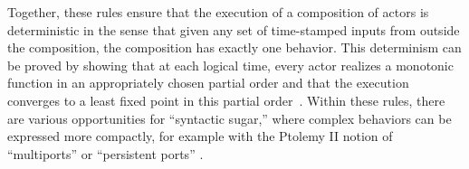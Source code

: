 \documentclass[sigconf]{acmart}
\newcommand{\martin}[1]{\mynote{Martin}{#1}{blue}}%
\newcommand{\marten}[1]{\mynote{Marten}{#1}{cyan}}%
\newcommand{\edward}[1]{\mynote{Edward}{#1}{magenta}}%
\begin{document}

Together, these rules ensure that the execution of a composition of actors is deterministic
in the sense that given any set of time-stamped inputs from outside the composition, the composition has exactly one behavior.
This determinism can be proved by showing that at each logical time, every actor realizes a monotonic function in an appropriately
chosen partial order and that the execution converges to a least fixed point in this partial order~\cite{LeeZheng:07:SRDECT}.
Within these rules, there are various opportunities for ``syntactic sugar,'' where complex behaviors can be expressed
more compactly, for example with the Ptolemy II notion of ``multiports'' or ``persistent ports'' \cite{Ptolemy:14:Book}.
\end{document}
